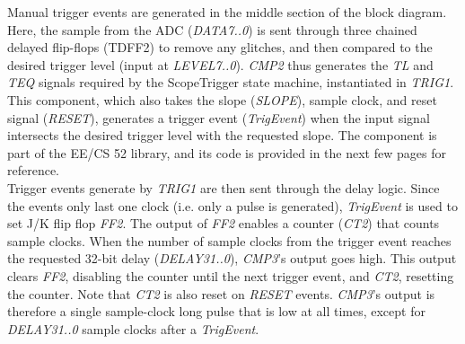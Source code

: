 \documentclass[titlepage]{scrartcl}
\begin{document}
	Manual trigger events are generated in the middle section of the block diagram. Here, the sample from the ADC (\textit{DATA7..0}) is sent through three chained delayed flip-flops (TDFF2) to remove any glitches, and then compared to the desired trigger level (input at \textit{LEVEL7..0}). \textit{CMP2} thus generates the \textit{TL} and \textit{TEQ} signals required by the ScopeTrigger state machine, instantiated in \textit{TRIG1}. This component, which also takes the slope (\textit{SLOPE}), sample clock, and reset signal (\textit{RESET}), generates a trigger event (\textit{TrigEvent}) when the input signal intersects the desired trigger level with the requested slope. The component is part of the EE/CS 52 library, and its code is provided in the next few pages for reference.\\

	

	Trigger events generate by \textit{TRIG1} are then sent through the delay logic. Since the events only last one clock (i.e. only a pulse is generated), \textit{TrigEvent} is used to set J/K flip flop \textit{FF2}. The output of \textit{FF2} enables a counter (\textit{CT2}) that counts sample clocks. When the number of sample clocks from the trigger event reaches the requested 32-bit delay (\textit{DELAY31..0}), \textit{CMP3}'s output goes high. This output clears \textit{FF2}, disabling the counter until the next trigger event, and \textit{CT2}, resetting the counter. Note that \textit{CT2} is also reset on \textit{RESET} events. \textit{CMP3}'s output is therefore a single sample-clock long pulse that is low at all times, except for \textit{DELAY31..0} sample clocks after a \textit{TrigEvent}.\\
\end{document}

